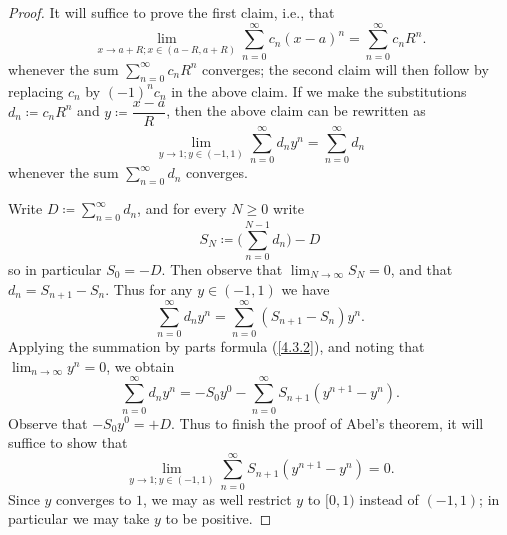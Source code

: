 \begin{proof}
  It will suffice to prove the first claim, i.e., that
  \[
    \lim_{x \to a + R ; x \in (a - R, a + R)} \sum_{n = 0}^\infty c_n (x - a)^n = \sum_{n = 0}^\infty c_n R^n.
  \]
  whenever the sum \(\sum_{n = 0}^\infty c_n R^n\) converges;
  the second claim will then follow by replacing \(c_n\) by \((-1)^n c_n\) in the above claim.
  If we make the substitutions \(d_n \coloneqq c_n R^n\) and \(y \coloneqq \dfrac{x - a}{R}\), then the above claim can be rewritten as
  \[
    \lim_{y \to 1 ; y \in (-1, 1)} \sum_{n = 0}^\infty d_n y^n = \sum_{n = 0}^\infty d_n
  \]
  whenever the sum \(\sum_{n = 0}^\infty d_n\) converges.

  Write \(D \coloneqq \sum_{n = 0}^\infty d_n\), and for every \(N \geq 0\) write
  \[
    S_N \coloneqq \bigg(\sum_{n = 0}^{N - 1} d_n\bigg) - D
  \]
  so in particular \(S_0 = -D\).
  Then observe that \(\lim_{N \to \infty} S_N = 0\), and that \(d_n = S_{n + 1} - S_n\).
  Thus for any \(y \in (-1, 1)\) we have
  \[
    \sum_{n = 0}^\infty d_n y^n = \sum_{n = 0}^\infty (S_{n + 1} - S_n) y^n.
  \]
  Applying the summation by parts formula (\cref{4.3.2}), and noting that \(\lim_{n \to \infty} y^n = 0\), we obtain
  \[
    \sum_{n = 0}^\infty d_n y^n = - S_0 y^0 - \sum_{n = 0}^\infty S_{n + 1} (y^{n + 1} - y^n).
  \]
  Observe that \(- S_0 y^0 = +D\).
  Thus to finish the proof of Abel's theorem,
  it will suffice to show that
  \[
    \lim_{y \to 1 ; y \in (-1, 1)} \sum_{n = 0}^\infty S_{n + 1} (y^{n + 1} - y^n) = 0.
  \]
  Since \(y\) converges to \(1\), we may as well restrict \(y\) to \([0, 1)\) instead of \((-1, 1)\);
  in particular we may take \(y\) to be positive.


\end{proof}
